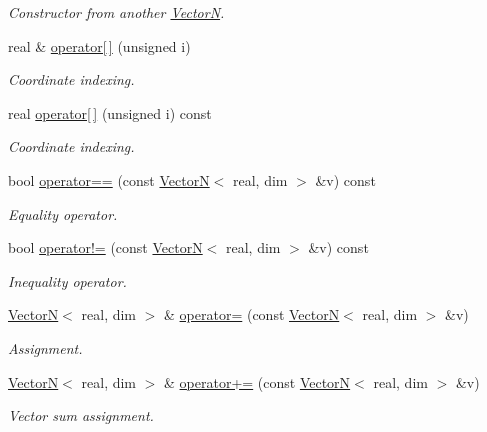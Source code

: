 \begin{DoxyCompactItemize}
\begin{DoxyCompactList}\small\item\em Constructor from another \hyperlink{classVectorN}{VectorN}. \end{DoxyCompactList}\item 
real \& \hyperlink{classVectorN_aa926f5c408d53dfc7ec581e9b47c27ad}{operator\mbox{[}$\,$\mbox{]}} (unsigned i)
\begin{DoxyCompactList}\small\item\em Coordinate indexing. \end{DoxyCompactList}\item 
real \hyperlink{classVectorN_a5463f965a3bb96d9b2a87b6392bc15c7}{operator\mbox{[}$\,$\mbox{]}} (unsigned i) const 
\begin{DoxyCompactList}\small\item\em Coordinate indexing. \end{DoxyCompactList}\item 
bool \hyperlink{classVectorN_abdb4216ebccd9e51dc74f9f3bf5ec4eb}{operator==} (const \hyperlink{classVectorN}{VectorN}$<$ real, dim $>$ \&v) const 
\begin{DoxyCompactList}\small\item\em Equality operator. \end{DoxyCompactList}\item 
bool \hyperlink{classVectorN_a2340b63fb9299ad20b23ff162692d720}{operator!=} (const \hyperlink{classVectorN}{VectorN}$<$ real, dim $>$ \&v) const 
\begin{DoxyCompactList}\small\item\em Inequality operator. \end{DoxyCompactList}\item 
\hyperlink{classVectorN}{VectorN}$<$ real, dim $>$ \& \hyperlink{classVectorN_a7202401fb6ed378c10a06397e46d9d49}{operator=} (const \hyperlink{classVectorN}{VectorN}$<$ real, dim $>$ \&v)
\begin{DoxyCompactList}\small\item\em Assignment. \end{DoxyCompactList}\item 
\hyperlink{classVectorN}{VectorN}$<$ real, dim $>$ \& \hyperlink{classVectorN_a91138a1f8badc1c7e656005f4f7cfe30}{operator+=} (const \hyperlink{classVectorN}{VectorN}$<$ real, dim $>$ \&v)
\begin{DoxyCompactList}\small\item\em Vector sum assignment. \end{DoxyCompactList}\item 

\end{DoxyCompactItemize}
